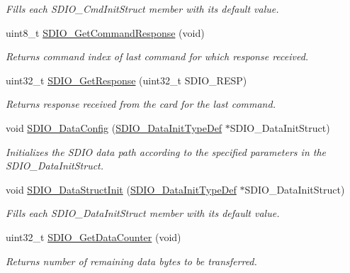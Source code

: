 \begin{DoxyCompactItemize}
\begin{DoxyCompactList}\small\item\em Fills each S\+D\+I\+O\+\_\+\+Cmd\+Init\+Struct member with its default value. \end{DoxyCompactList}\item 
uint8\+\_\+t \mbox{\hyperlink{group___s_d_i_o___exported___functions_ga9badf271c818e09da301d715c4ad0e5b}{S\+D\+I\+O\+\_\+\+Get\+Command\+Response}} (void)
\begin{DoxyCompactList}\small\item\em Returns command index of last command for which response received. \end{DoxyCompactList}\item 
uint32\+\_\+t \mbox{\hyperlink{group___s_d_i_o___exported___functions_ga5c1e859511840e8cca6a9a768bce220b}{S\+D\+I\+O\+\_\+\+Get\+Response}} (uint32\+\_\+t S\+D\+I\+O\+\_\+\+R\+E\+SP)
\begin{DoxyCompactList}\small\item\em Returns response received from the card for the last command. \end{DoxyCompactList}\item 
void \mbox{\hyperlink{group___s_d_i_o___exported___functions_gad65d896ae919683585bda44a1e2afae4}{S\+D\+I\+O\+\_\+\+Data\+Config}} (\mbox{\hyperlink{struct_s_d_i_o___data_init_type_def}{S\+D\+I\+O\+\_\+\+Data\+Init\+Type\+Def}} $\ast$S\+D\+I\+O\+\_\+\+Data\+Init\+Struct)
\begin{DoxyCompactList}\small\item\em Initializes the S\+D\+IO data path according to the specified parameters in the S\+D\+I\+O\+\_\+\+Data\+Init\+Struct. \end{DoxyCompactList}\item 
void \mbox{\hyperlink{group___s_d_i_o___exported___functions_gaa83209c09e921521aca2587fb5b22ea2}{S\+D\+I\+O\+\_\+\+Data\+Struct\+Init}} (\mbox{\hyperlink{struct_s_d_i_o___data_init_type_def}{S\+D\+I\+O\+\_\+\+Data\+Init\+Type\+Def}} $\ast$S\+D\+I\+O\+\_\+\+Data\+Init\+Struct)
\begin{DoxyCompactList}\small\item\em Fills each S\+D\+I\+O\+\_\+\+Data\+Init\+Struct member with its default value. \end{DoxyCompactList}\item 
uint32\+\_\+t \mbox{\hyperlink{group___s_d_i_o___exported___functions_ga7a28aaa2c25a9a5a8db1f49b0e8c9d0a}{S\+D\+I\+O\+\_\+\+Get\+Data\+Counter}} (void)
\begin{DoxyCompactList}\small\item\em Returns number of remaining data bytes to be transferred. \end{DoxyCompactList}\item 

\end{DoxyCompactItemize}

